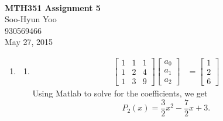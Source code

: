 \documentclass[12pt,letterpaper]{article}
\begin{document}
\fancyfoot{}
\begin{center}
  \hfill \\
  \vspace{4in}
  {\bf\Huge MTH351 Assignment 5} \\
  \vspace{2in}
  {\Large Soo-Hyun Yoo \\ 930569466 \\ May 27, 2015}
\end{center}

\newpage
{}


\begin{enumerate}
  \item
    \begin{enumerate}
      \item
        \begin{align*}
          \begin{bmatrix}
            1 & 1 & 1 \\
            1 & 2 & 4 \\
            1 & 3 & 9
          \end{bmatrix}
          \begin{bmatrix}
            a_0 \\ a_1 \\ a_2
          \end{bmatrix}
          &=
          \begin{bmatrix}
            1 \\ 2 \\ 6
          \end{bmatrix}
        \end{align*}
        Using Matlab to solve for the coefficients, we get \[P_2(x)=\frac32x^2-\frac72x+3.\]


\end{enumerate}
\end{enumerate}
\end{document}
